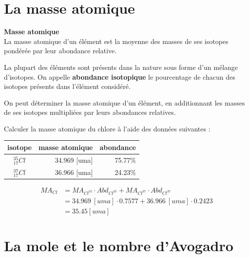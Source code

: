 \documentclass[
  11pt,
  a4paper,
  openany]{book}
\begin{document}
\clearpage

\hypertarget{la-masse-atomique}{%
\section{La masse atomique}\label{la-masse-atomique}}

\begin{tcolorbox}
\textbf{Masse atomique}\\
La masse atomique d'un élément est la moyenne des masses de ses isotopes pondérée par leur abondance relative.

\end{tcolorbox}

La plupart des éléments sont présents dans la nature sous forme d'un mélange d'isotopes. On appelle \textbf{abondance isotopique} le pourcentage de chacun des isotopes présents dans l'élément considéré.

On peut déterminer la masse atomique d'un élément, en additionnant les masses de ses isotopes multipliées par leurs abondances relatives.

\begin{Exercise}
Calculer la masse atomique du chlore à l'aide des données suivantes :

\end{Exercise}

\begin{longtable}[]{@{}crr@{}}
\toprule()
isotope & masse atomique & abondance \\
\midrule()
\endhead
\(_{17}^{35}Cl\) & 34.969 {[}uma{]} & 75.77\% \\
\(_{17}^{37}Cl\) & 36.966 {[}uma{]} & 24.23\% \\
\bottomrule()
\end{longtable}


\begin{Answer}
\[ \begin{split}
    MA_{Cl} &=  MA_{Cl^{35}} \cdot Abd_{Cl^{35}} + MA_{Cl^{37}} \cdot Abd_{Cl^{37}}\\
        &= 34.969~[uma] \cdot 0.7577 + 36.966~[uma] \cdot 0.2423\\
        &= 35.45 [uma]
    \end{split} \]

\end{Answer}

\clearpage

\hypertarget{la-mole-et-le-nombre-davogadro}{%
\section{La mole et le nombre d'Avogadro}\label{la-mole-et-le-nombre-davogadro}}
\end{document}

